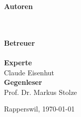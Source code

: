 \begin{titlepage}
		
	\begin{minipage}{\linewidth}
	
	\end{minipage}
	\begin{minipage}{\linewidth}
	\begin{minipage}[t]{0.33\linewidth}
		\Large \textbf{Autoren} \\
		\Large \rlif \\
		\Large \chuf \\
		\Large \fscf
	\end{minipage}
	\hfill\begin{minipage}[t]{0.5\linewidth}
		\Large \textbf{Betreuer} \\
		\Large \proff \\
		\textbf{\Large Experte}\\
		\Large Claude Eisenhut \\
		\textbf{\Large Gegenleser}\\
		\Large Prof. Dr. Markus Stolze
	\end{minipage}
	\end{minipage}
		
	\begin{minipage}{0.33\linewidth}	
		
	\end{minipage}
	\begin{minipage}{0.33\linewidth}
		
		
	\end{minipage}
	\begin{minipage}{0.33\linewidth}
	
	\end{minipage}
	\vfill
	\Large Rapperswil, \today

\end{titlepage}

\restoregeometry
